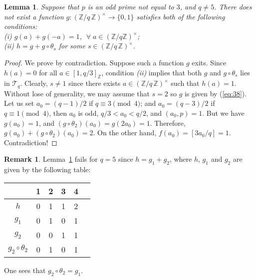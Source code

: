 \documentclass{amsart}[11pt]
\newtheorem{lem}[thm]{Lemma}
\theoremstyle{definition}
\newtheorem{rem}[thm]{Remark}
\numberwithin{equation}{section}
\theoremstyle{notitle}
\begin{document}
\begin{lem}\label{lem:splitting_for_2_twist}
  Suppose that $p$ is an odd prime not equal to $3$, and $q\neq
  5$. There does not exist a function $g:{(\mathbb{Z}/ {q}\, \mathbb{Z})^\times}\to \{0, 1\}$ 
 satisfies both of the following conditions:\\
 (i)\phantom{i} $g(a)+g(-a)=1$, $\; \forall\; a\in ({\mathbb{Z}}/q{\mathbb{Z}})^\times$; \\
 (ii) $h= g+g\circ \theta_s$ for some $s\in {(\mathbb{Z}/ {q}\, \mathbb{Z})^\times}$.
\end{lem}
\begin{proof}
  We prove by contradiction. Suppose such a function $g$ exits. Since
  $h(a)=0$ for all $a\in [1, q/3]_{\mathbb{Z}}$, condition \textit{(ii)}
  implies that both $g$ and $g\circ \theta_s$ lies in
  ${\mathscr{T}}_q$. Clearly, $s\neq 1$ since there exists $a\in {(\mathbb{Z}/ {q}\, \mathbb{Z})^\times}$ such
  that $h(a)=1$.  Without lose of generality, we may assume that $s=2$
  so $g$ is given by (\ref{eq:38}).  Let us set $a_0= (q-1)/2$ if
  $q\equiv 3 \pmod{4}$; and $a_0= (q-3)/2$ if $q\equiv 1 \pmod{4}$,
  then $a_0$ is odd, $q/3<a_0< q/2$, and $(a_0, p)=1$. But we have
  $g(a_0)=1$, and $(g\circ\theta_2)(a_0)=g(2a_0)=1$.  Therefore,
  $g(a_0)+(g\circ\theta_2)(a_0)=2$. On the other hand,
  $f(a_0)=[3a_0/q]=1$. Contradiction!
\end{proof}

\begin{rem}\label{rem:case-q-is-5}
 Lemma~\ref{lem:splitting_for_2_twist} fails for $q=5$ since
 $h=g_1+g_2$, where $h$, $g_1$ and $g_2$ are given by the following table:
  \begin{center}
  \begin{tabular}{|c||c|c|c|c|c|}
\hline
    & 1 & 2 & 3 & 4 \\
\hline
  $h$ & 0 & 1 & 1 & 2\\
  $g_1$& 0 & 1 & 0 & 1 \\
  $g_2$& 0 & 0 & 1 & 1\\
  $g_2\circ \theta_2$& 0 & 1 & 0 & 1\\
\hline
  \end{tabular}
  \end{center}
  One sees that $g_2\circ \theta_2=g_1$.
\end{rem}
\end{document}
